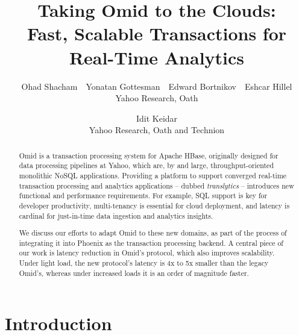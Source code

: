 \documentclass[twocolumn,10pt]{article}
\begin{document}
\date{}

\title{Taking Omid to the Clouds: \\ 
Fast,  Scalable Transactions for Real-Time  Analytics }


\author{
Ohad Shacham\ \ 
Yonatan Gottesman\ \ 
Edward Bortnikov\ \ 
Eshcar Hillel\\ 
Yahoo Research, Oath 
\and
Idit Keidar\\
Yahoo Research, Oath and Technion 
} %


\maketitle



\begin{abstract}



Omid is a transaction processing system for Apache HBase, originally designed for data processing pipelines at Yahoo, which are, by and large, 
throughput-oriented monolithic NoSQL applications. 
Providing a platform 
to support 
converged real-time transaction processing and analytics applications --
dubbed {\em translytics} --  
introduces new functional and performance requirements. For example, SQL 
support is key for developer productivity, multi-tenancy is essential for cloud deployment, 
and latency is cardinal for just-in-time data ingestion and analytics insights.

We discuss our efforts to adapt Omid to these new domains, 
as part of 
the process of integrating it into Phoenix as the transaction processing backend. A central piece
of our work is latency reduction in Omid's protocol, which also improves  scalability.  
Under light load, the new protocol's latency is 4x to 5x smaller than the legacy Omid's, whereas 
under increased loads it is an order of magnitude faster. 
\end{abstract}


\section{Introduction} \label{sec:intro}
 
\end{document}
